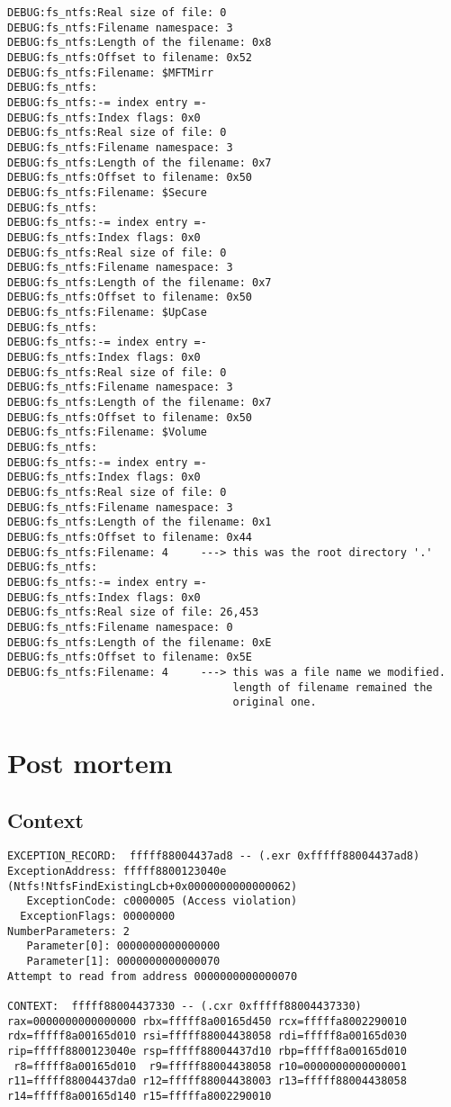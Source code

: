 \documentclass[12pt]{article}
\begin{document}
\begin{verbatim}
DEBUG:fs_ntfs:Real size of file: 0
DEBUG:fs_ntfs:Filename namespace: 3
DEBUG:fs_ntfs:Length of the filename: 0x8
DEBUG:fs_ntfs:Offset to filename: 0x52
DEBUG:fs_ntfs:Filename: $MFTMirr
DEBUG:fs_ntfs:
DEBUG:fs_ntfs:-= index entry =-
DEBUG:fs_ntfs:Index flags: 0x0
DEBUG:fs_ntfs:Real size of file: 0
DEBUG:fs_ntfs:Filename namespace: 3
DEBUG:fs_ntfs:Length of the filename: 0x7
DEBUG:fs_ntfs:Offset to filename: 0x50
DEBUG:fs_ntfs:Filename: $Secure
DEBUG:fs_ntfs:
DEBUG:fs_ntfs:-= index entry =-
DEBUG:fs_ntfs:Index flags: 0x0
DEBUG:fs_ntfs:Real size of file: 0
DEBUG:fs_ntfs:Filename namespace: 3
DEBUG:fs_ntfs:Length of the filename: 0x7
DEBUG:fs_ntfs:Offset to filename: 0x50
DEBUG:fs_ntfs:Filename: $UpCase
DEBUG:fs_ntfs:
DEBUG:fs_ntfs:-= index entry =-
DEBUG:fs_ntfs:Index flags: 0x0
DEBUG:fs_ntfs:Real size of file: 0
DEBUG:fs_ntfs:Filename namespace: 3
DEBUG:fs_ntfs:Length of the filename: 0x7
DEBUG:fs_ntfs:Offset to filename: 0x50
DEBUG:fs_ntfs:Filename: $Volume
DEBUG:fs_ntfs:
DEBUG:fs_ntfs:-= index entry =-
DEBUG:fs_ntfs:Index flags: 0x0
DEBUG:fs_ntfs:Real size of file: 0
DEBUG:fs_ntfs:Filename namespace: 3
DEBUG:fs_ntfs:Length of the filename: 0x1
DEBUG:fs_ntfs:Offset to filename: 0x44
DEBUG:fs_ntfs:Filename: 4     ---> this was the root directory '.'
DEBUG:fs_ntfs:
DEBUG:fs_ntfs:-= index entry =-
DEBUG:fs_ntfs:Index flags: 0x0
DEBUG:fs_ntfs:Real size of file: 26,453
DEBUG:fs_ntfs:Filename namespace: 0
DEBUG:fs_ntfs:Length of the filename: 0xE
DEBUG:fs_ntfs:Offset to filename: 0x5E
DEBUG:fs_ntfs:Filename: 4     ---> this was a file name we modified.
                                   length of filename remained the
                                   original one.

\end{verbatim}

\section{Post mortem}\label{results}
\subsection{Context}
\begin{verbatim}
EXCEPTION_RECORD:  fffff88004437ad8 -- (.exr 0xfffff88004437ad8)
ExceptionAddress: fffff8800123040e (Ntfs!NtfsFindExistingLcb+0x0000000000000062)
   ExceptionCode: c0000005 (Access violation)
  ExceptionFlags: 00000000
NumberParameters: 2
   Parameter[0]: 0000000000000000
   Parameter[1]: 0000000000000070
Attempt to read from address 0000000000000070

CONTEXT:  fffff88004437330 -- (.cxr 0xfffff88004437330)
rax=0000000000000000 rbx=fffff8a00165d450 rcx=fffffa8002290010
rdx=fffff8a00165d010 rsi=fffff88004438058 rdi=fffff8a00165d030
rip=fffff8800123040e rsp=fffff88004437d10 rbp=fffff8a00165d010
 r8=fffff8a00165d010  r9=fffff88004438058 r10=0000000000000001
r11=fffff88004437da0 r12=fffff88004438003 r13=fffff88004438058
r14=fffff8a00165d140 r15=fffffa8002290010
\end{verbatim}
\end{document}
